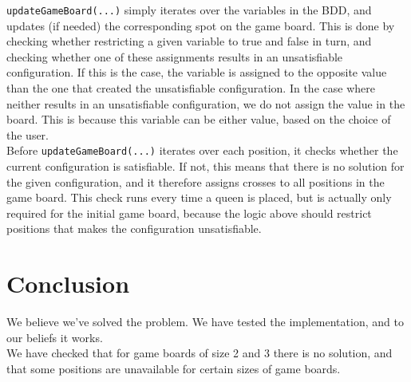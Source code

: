 \texttt{updateGameBoard(...)} simply iterates over the variables in the BDD, and updates (if needed) the corresponding spot on the game board. This is done by checking whether restricting a given variable to true and false in turn, and checking whether one of these assignments results in an unsatisfiable configuration. If this is the case, the variable is assigned to the opposite value than the one that created the unsatisfiable configuration. In the case where neither results in an unsatisfiable configuration, we do not assign the value in the board. This is because this variable can be either value, based on the choice of the user. \\

Before \texttt{updateGameBoard(...)} iterates over each position, it checks whether the current configuration is satisfiable. If not, this means that there is no solution for the given configuration, and it therefore assigns crosses to all positions in the game board. This check runs every time a queen is placed, but is actually only required for the initial game board, because the logic above should restrict positions that makes the configuration unsatisfiable.

\section{Conclusion}
We believe we've solved the problem. We have tested the implementation, and to our beliefs it works. \\

We have checked that for game boards of size 2 and 3 there is no solution, and that some positions are unavailable for certain sizes of game boards.